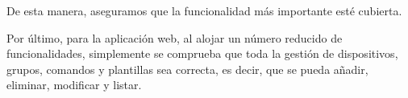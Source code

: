 De esta manera, aseguramos que la funcionalidad más importante esté cubierta.

Por último, para la aplicación web, al alojar un número reducido de funcionalidades, simplemente se comprueba que
toda la gestión de dispositivos, grupos, comandos y plantillas sea correcta, es decir, que se pueda añadir, eliminar,
modificar y listar.